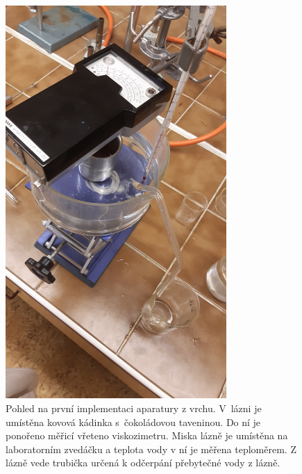\documentclass[12pt]{article}
\begin{document}
\begin{figure}
    \centering
    \includegraphics[angle = 270, width = 0.75\textwidth]{prilohy/aparatura_lab_vrch.jpg}
    \caption{Pohled na první implementaci aparatury z vrchu. V~lázni je umístěna kovová kádinka s~čokoládovou taveninou. Do ní je ponořeno měřicí vřeteno viskozimetru. Miska lázně je umístěna na laboratorním zvedáčku a teplota vody v ní je měřena teploměrem. Z lázně vede trubička určená k odčerpání přebytečné vody z lázně.}
    \label{fig:aparatura_lab_bok}
\end{figure}
\end{document}
